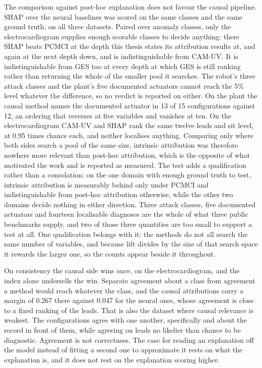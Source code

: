 The comparison against post-hoc explanation does not favour the causal pipeline. SHAP over the neural baselines was scored on the same classes and the same ground truth, on all three datasets. Paired over anomaly classes, only the electrocardiogram supplies enough scorable classes to decide anything: there SHAP beats PCMCI at the depth this thesis states its attribution results at, and again at the next depth down, and is indistinguishable from CAM-UV. It is indistinguishable from GES too at every depth at which GES is still ranking rather than returning the whole of the smaller pool it searches. The robot's three attack classes and the plant's five documented actuators cannot reach the 5\% level whatever the difference, so no verdict is reported on either. On the plant the causal method names the documented actuator in 13 of 15 configurations against 12, an ordering that reverses at five variables and vanishes at ten. On the electrocardiogram CAM-UV and SHAP rank the same twelve leads and sit level, at 0.95 times chance each, and neither localises anything. Comparing only where both sides search a pool of the same size, intrinsic attribution was therefore nowhere more relevant than post-hoc attribution, which is the opposite of what motivated the work and is reported as measured. The test adds a qualification rather than a consolation: on the one domain with enough ground truth to test, intrinsic attribution is measurably behind only under PCMCI and indistinguishable from post-hoc attribution otherwise, while the other two domains decide nothing in either direction. Three attack classes, five documented actuators and fourteen localisable diagnoses are the whole of what three public benchmarks supply, and two of those three quantities are too small to support a test at all. One qualification belongs with it: the methods do not all search the same number of variables, and because lift divides by the size of that search space it rewards the larger one, so the counts appear beside it throughout.

On consistency the causal side wins once, on the electrocardiogram, and the index alone undersells the win. Separate agreement about a class from agreement a method would reach whatever the class, and the causal attributions carry a margin of 0.267 there against 0.047 for the neural ones, whose agreement is close to a fixed ranking of the leads. That is also the dataset where causal relevance is weakest. The configurations agree with one another, specifically and about the record in front of them, while agreeing on leads no likelier than chance to be diagnostic. Agreement is not correctness. The case for reading an explanation off the model instead of fitting a second one to approximate it rests on what the explanation is, and it does not rest on the explanation scoring higher.

